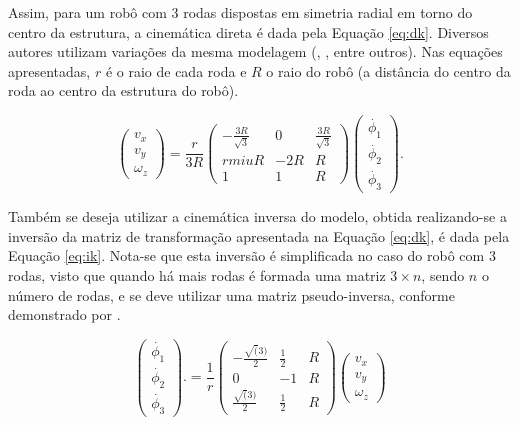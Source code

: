 Assim, para um robô com 3 rodas dispostas em simetria radial em torno do centro da estrutura, a cinemática direta é dada pela Equação \ref{eq:dk}. Diversos autores utilizam variações da mesma modelagem (\cite{rojas2006holonomic}, \cite{pin1994new}, entre outros). Nas equações apresentadas, $r$ é o raio de cada roda e $R$ o raio do robô (a distância do centro da roda ao centro da estrutura do robô).

\begin{equation}
  \begin{pmatrix}
    v_x \\
    v_y \\
    \omega_z
  \end{pmatrix}
  =
  \frac{r}{3R}
  \begin{pmatrix}
    -\frac{3R}{\sqrt{3}} & 0   & \frac{3R}{\sqrt{3}} \\rmiu
    R                    & -2R & R                   \\
    1                    & 1   & R
  \end{pmatrix}
  \begin{pmatrix}
    \dot{\phi_1} \\
    \dot{\phi_2} \\
    \dot{\phi_3}
  \end{pmatrix}.
  \label{eq:dk}
\end{equation}

Também se deseja utilizar a cinemática inversa do modelo, obtida realizando-se a inversão da matriz de transformação apresentada na Equação \ref{eq:dk}, é dada pela Equação \ref{eq:ik}. Nota-se que esta inversão é simplificada no caso do robô com 3 rodas, visto que quando há mais rodas é formada uma matriz $3 \times n$, sendo $n$ o número de rodas, e se deve utilizar uma matriz pseudo-inversa, conforme demonstrado por \cite{rojas2006holonomic}.

\begin{equation}
  \begin{pmatrix}
    \dot{\phi_1} \\
    \dot{\phi_2} \\
    \dot{\phi_3}
  \end{pmatrix}.
  =
  \frac{1}{r}
  \begin{pmatrix}
    -\frac{\sqrt(3)}{2} & \frac{1}{2} & R \\
    0                   & -1          & R \\
    \frac{\sqrt(3)}{2}  & \frac{1}{2} & R
  \end{pmatrix}
  \begin{pmatrix}
    v_x \\
    v_y \\
    \omega_z
  \end{pmatrix}
  \label{eq:ik}
\end{equation}

